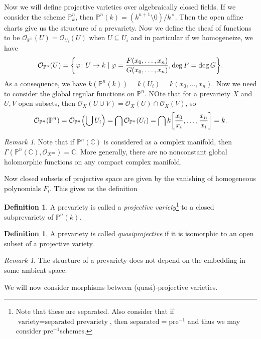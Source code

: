 \documentclass[leqno, openany]{memoir}
\theoremstyle{definition}
\newtheorem{defn}[thm]{Definition}
\theoremstyle{remark}
\newtheorem{rmk}[thm]{Remark}
\theoremstyle{plain}
\theoremstyle{definition}
\theoremstyle{remark}
\newcommand{\C}{\mathbb{C}}
\renewcommand{\P}{\mathbb{P}}
\newcommand{\mc}[1]{\mathcal{#1}}
\newcommand{\mr}[1]{\mathrm{#1}}
\begin{document}
Now we will define projective varieties over algebraically closed fields. If we consider the scheme $\P^n_k$, then $\P^n(k) = (k^{n+1} \setminus \qty{0}) / k^{\times}$. Then the open affine charts give us the structure of a prevariety. Now we define the sheaf of functions to be $\mc{O}_{\P^n}(U) = \mc{O}_{U_i}(U)$ when $U \subseteq U_i$ and in particular if we homogeneize, we have
\[ \mc{O}_{\P^n}(U) = \qty{\varphi \colon U \to k \mid \varphi = \frac{F(x_0, \ldots, x_n)}{G(x_0, \ldots, x_n)}, \deg F = \deg G}. \]
As a consequence, we have $k(\P^n(k)) = k(U_i) = k(x_0, \ldots, x_n)$. Now we need to consider the global regular functions on $\P^n$. NOte that for a prevariety $X$ and $U,V$ open subsets, then $\mc{O}_X(U \cup V) = \mc{O}_X(U) \cap \mc{O}_X(V)$, so
\[ \mc{O}_{\P^n}(\P^n) = \mc{O}_{\P^n} \qty(\bigcup U_i) = \bigcap \mc{O}_{\P^n}(U_i) = \bigcap k\qty[ \frac{x_0}{x_i}, \ldots, \frac{x_n}{x_i} ] = k. \]

\begin{rmk}
    Note that if $\P^n(\C)$ is considered as a complex manifold, then $\Gamma(\P^n(\C), \mc{O}_{X^{\mr{an}}}) = \C$. More generally, there are no nonconstant global holomorphic functions on any compact complex manifold.
\end{rmk}

Now closed subsets of projective space are given by the vanishing of homogeneous polynomials $F_i$. This gives us the definition
\begin{defn}
    A prevariety is called a \textit{projective variety}\footnote{Note that these are separated. Also consider that if $\text{variety} = \text{separated prevariety}$, then $\text{separated} = \text{pre}^{-1}$ and thus we may consider $\text{pre}^{-1}$schemes.} to a closed subprevariety of $\P^n(k)$.
\end{defn}

\begin{defn}
    A prevariety is called \textit{quasiprojective} if it is isomorphic to an open subset of a projective variety.
\end{defn}

\begin{rmk}
    The structure of a prevariety does not depend on the embedding in some ambient space.
\end{rmk}

We will now consider morphisms between (quasi)-projective varieties.
\end{document}

